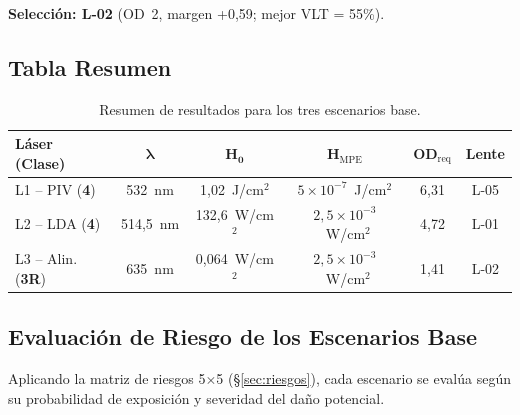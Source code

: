 \documentclass[12pt,a4paper]{article}
\begin{document}
\textbf{Selección: L-02} (OD~2, margen +0,59; mejor VLT = 55\%).

\subsection{Tabla Resumen}

\begin{table}[H]
	\centering
	\caption{Resumen de resultados para los tres escenarios base.}
	\label{tab:resumen}
	\small
	\begin{tabular}{l c c c c c}
		\toprule
		\textbf{Láser (Clase)}    & $\boldsymbol{\lambda}$
		                          & $\boldsymbol{H_0}$               & $\boldsymbol{H_{\mathrm{MPE}}}$
		                          & $\boldsymbol{OD_{\mathrm{req}}}$ & \textbf{Lente}                                                                    \\
		\midrule
		L1 -- PIV (\textbf{4})    & 532~nm                           & 1,02~J/cm$^2$                   & $5\!\times\!10^{-7}$~J/cm$^2$     & 6,31 & L-05 \\
		L2 -- LDA (\textbf{4})    & 514,5~nm                         & 132,6~W/cm$^2$                  & $2{,}5\!\times\!10^{-3}$~W/cm$^2$ & 4,72 & L-01 \\
		L3 -- Alin. (\textbf{3R}) & 635~nm                           & 0,064~W/cm$^2$                  & $2{,}5\!\times\!10^{-3}$~W/cm$^2$ & 1,41 & L-02 \\
		\bottomrule
	\end{tabular}
\end{table}

\subsection{Evaluación de Riesgo de los Escenarios Base}
\label{sec:riesgo_base}

Aplicando la matriz de riesgos 5$\times$5 (§\ref{sec:riesgos}), cada escenario
se evalúa según su probabilidad de exposición y severidad del daño potencial.
\end{document}
